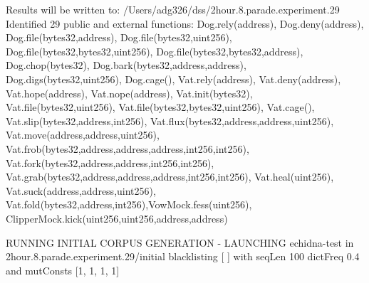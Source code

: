 \documentclass[sigconf]{acmart}
\begin{document}
{\begin{figure*}
{\begin{code}
Results will be written to: /Users/adg326/dss/2hour.8.parade.experiment.29
Identified 29 public and external functions: Dog.rely(address), Dog.deny(address), Dog.file(bytes32,address), Dog.file(bytes32,uint256),
  Dog.file(bytes32,bytes32,uint256), Dog.file(bytes32,bytes32,address), Dog.chop(bytes32), Dog.bark(bytes32,address,address), Dog.digs(bytes32,uint256),
   Dog.cage(), Vat.rely(address), Vat.deny(address), Vat.hope(address), Vat.nope(address), Vat.init(bytes32), Vat.file(bytes32,uint256), Vat.file(bytes32,bytes32,uint256),
  Vat.cage(), Vat.slip(bytes32,address,int256), Vat.flux(bytes32,address,address,uint256), Vat.move(address,address,uint256),
   Vat.frob(bytes32,address,address,address,int256,int256), Vat.fork(bytes32,address,address,int256,int256), Vat.grab(bytes32,address,address,address,int256,int256),
  Vat.heal(uint256), Vat.suck(address,address,uint256), Vat.fold(bytes32,address,int256),VowMock.fess(uint256), ClipperMock.kick(uint256,uint256,address,address)

\vspace{0.1in}
  
RUNNING INITIAL CORPUS GENERATION
- LAUNCHING echidna-test in 2hour.8.parade.experiment.29/initial blacklisting [  ] with seqLen 100 dictFreq 0.4 and mutConsts  [1, 1, 1, 1]

\vspace{0.1in}


\end{code}}
\end{figure*}}
\end{document}
